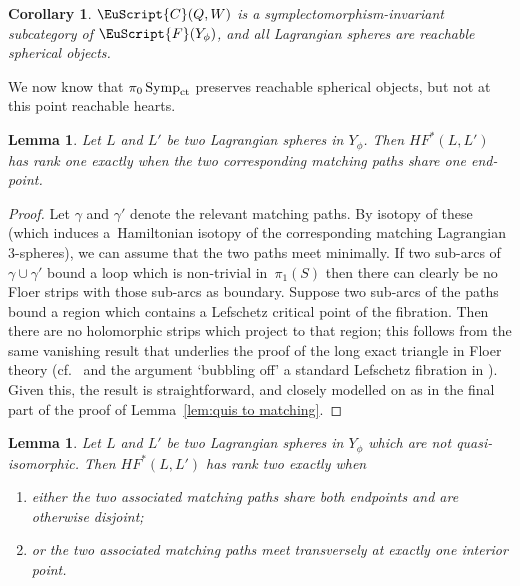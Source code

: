 \documentclass[pdftex]{sigma}
\newcommand{\scrF}{\EuScript{F}}
\newcommand{\scrC}{\EuScript{C}}
\DeclareMathOperator{\Symp}{Symp}
\newtheorem{lem}[thm]{Lemma}
\newtheorem{cor}[thm]{Corollary}
\theoremstyle{definition}
\numberwithin{equation}{section}
\begin{document}
\begin{cor}
 $\scrC(Q,W)$ is a symplectomorphism-invariant subcategory of $\scrF(Y_{\phi})$, and all Lagrangian spheres are reachable spherical objects.
\end{cor}

We now know that $\pi_0\Symp_{\rm ct}$ preserves reachable spherical objects, but not at this point reachable hearts.

\begin{lem} \label{lem:HF rank one}
Let $L$ and $L'$ be two Lagrangian spheres in $Y_\phi$. Then $HF^*(L,L')$ has rank one exactly when the two corresponding matching paths share one end-point.
\end{lem}

\begin{proof}
Let $\gamma$ and $\gamma'$ denote the relevant matching paths. By isotopy of these (which induces a~Hamiltonian isotopy of the corresponding matching Lagrangian 3-spheres), we can assume that the two paths meet minimally. If two sub-arcs of~$\gamma \cup \gamma'$ bound a loop which is non-trivial in~$\pi_1(S)$ then there can clearly be no Floer strips with those sub-arcs as boundary. Suppose two sub-arcs of the paths bound a region which contains a Lefschetz critical point of the fibration. Then there are no holomorphic strips which project to that region; this follows from the same vanishing result that underlies the proof of the long exact triangle in Floer theory (cf.~\cite[Lemma 17.4, Remark~17.8]{Seidel:FCPLT} and the argument `bubbling off' a standard Lefschetz fibration in \cite[Section 17d]{Seidel:FCPLT}). Given this, the result is straightforward, and closely modelled on \cite{Khovanov-Seidel} as in the final part of the proof of Lemma~\ref{lem:quis to matching}.
\end{proof}

\begin{lem} \label{lem:HF rank two}
Let $L$ and $L'$ be two Lagrangian spheres in $Y_\phi$ which are not quasi-isomorphic. Then $HF^*(L,L')$ has rank two exactly when
\begin{enumerate}\itemsep=0pt
\item[$(1)$] either the two associated matching paths share both endpoints and are otherwise disjoint;
\item[$(2)$] or the two associated matching paths meet transversely at exactly one interior point.
\end{enumerate}
\end{lem}
\end{document}

